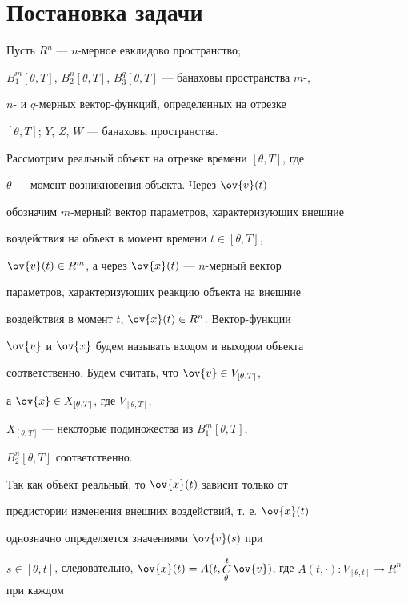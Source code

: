 \section{Постановка задачи}





Пусть $R^n$ --- $n$-мерное евклидово пространство;


$B^m_1 [\theta,T]$, $B^n_2


[\theta,T]$, $B^q_3 [\theta,T]$ ---  банаховы пространства $m$-,


$n$- и $q$-мерных вектор-функций, определенных на отрезке


$[\theta,T]$; $Y$, $Z$, $W$ --- банаховы пространства.





Рассмотрим реальный объект на отрезке времени $[\theta,T]$, где


$\theta$ --- момент возникновения объекта. Через $\ov{v}(t)$


обозначим $m$-мерный вектор параметров, характеризующих внешние


воздействия на объект в момент времени $t\in[\theta,T]$,


$\ov{v}(t)\in R^m$, а через $\ov{x}(t)$ --- $n$-мерный вектор


параметров, характеризующих реакцию объекта на внешние


воздействия в момент $t$, $\ov{x}(t)\in R^n$. Вектор-функции


$\ov{v}$ и $\ov{x}$ будем называть входом и выходом объекта


соответственно. Будем считать, что $\ov{v}\in V_{[\theta, T]}$,


а $\ov{x}\in X_{[\theta,T]}$, где $V_{[\theta,T]}$, 


$X_{[\theta,T]}$ --- некоторые подмножества из $B^m_1[\theta,T]$,


$B^n_2[\theta,T]$ соответственно.





Так как объект реальный, то $\ov{x}(t)$ зависит только от


предистории изменения внешних воздействий, т. е. $\ov{x}(t)$


однозначно определяется значениями $\ov{v}(s)$ при


$s\in[\theta,t]$, следовательно, $\ov{x}(t)=A(t,\Cu^t_\theta


\ov{v})$, где $A(t,\cdot):V_{[\theta,t]}\to R^n$ при каждом


